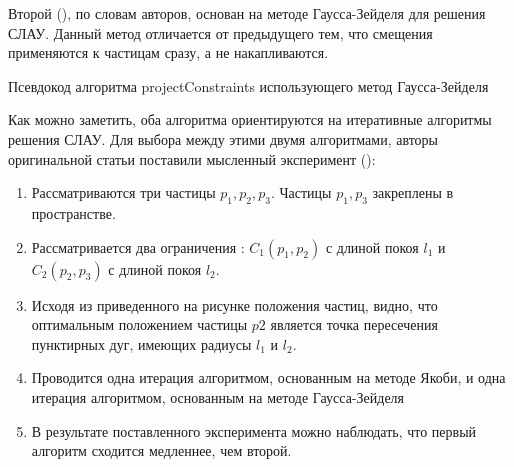 	Второй (), по словам авторов, основан на методе Гаусса-Зейделя для решения СЛАУ. Данный метод отличается от предыдущего тем, что смещения применяются к частицам сразу, а не накапливаются.

	\begin{algorithm} %
	\nonl{}
	\caption{Псевдокод алгоритма projectConstraints использующего метод Гаусса-Зейделя}\label{alg:projectConstraintsGauss}
	\end{algorithm}
	\FloatBarrier
	
	Как можно заметить, оба алгоритма ориентируются на итеративные алгоритмы решения СЛАУ. Для выбора между этими двумя алгоритмами, авторы оригинальной статьи поставили мысленный эксперимент ():
	
	\begin{enumerate}[1.]
		\item Рассматриваются три частицы $p_1, p_2, p_3$. Частицы $p_1, p_3$ закреплены в пространстве.
		\item Рассматривается два ограничения : $C_1(p_1, p_2)$ с длиной покоя $l_1$ и $C_2(p_2, p_3)$ с длиной покоя $l_2$.
		\item Исходя из приведенного на рисунке положения частиц, видно, что оптимальным положением частицы $p2$ является точка пересечения пунктирных дуг, имеющих радиусы $l_1$ и $l_2$.
		\item Проводится одна итерация алгоритмом, основанным на методе Якоби, и одна итерация алгоритмом, основанным на методе Гаусса-Зейделя
		\item В результате поставленного эксперимента можно наблюдать, что первый алгоритм сходится медленнее, чем второй.
	\end{enumerate}
		
